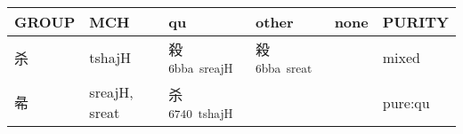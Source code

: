 \documentclass[14pt,a4paper]{scrartcl}
\begin{document}
\begin{longtable}[c]{@{}llllll@{}}
\toprule
\begin{minipage}[b]{0.14\columnwidth}\raggedright\strut
GROUP
\strut\end{minipage} &
\begin{minipage}[b]{0.14\columnwidth}\raggedright\strut
MCH
\strut\end{minipage} &
\begin{minipage}[b]{0.14\columnwidth}\raggedright\strut
qu
\strut\end{minipage} &
\begin{minipage}[b]{0.14\columnwidth}\raggedright\strut
other
\strut\end{minipage} &
\begin{minipage}[b]{0.14\columnwidth}\raggedright\strut
none
\strut\end{minipage} &
\begin{minipage}[b]{0.14\columnwidth}\raggedright\strut
PURITY
\strut\end{minipage}\tabularnewline
\midrule
\endhead
\begin{minipage}[t]{0.14\columnwidth}\raggedright\strut
杀
\strut\end{minipage} &
\begin{minipage}[t]{0.14\columnwidth}\raggedright\strut
tshajH
\strut\end{minipage} &
\begin{minipage}[t]{0.14\columnwidth}\raggedright\strut
殺\textsuperscript{6bba~sreajH}
\strut\end{minipage} &
\begin{minipage}[t]{0.14\columnwidth}\raggedright\strut
殺\textsuperscript{6bba~sreat}
\strut\end{minipage} &
\begin{minipage}[t]{0.14\columnwidth}\raggedright\strut
\strut\end{minipage} &
\begin{minipage}[t]{0.14\columnwidth}\raggedright\strut
mixed
\strut\end{minipage}\tabularnewline
\begin{minipage}[t]{0.14\columnwidth}\raggedright\strut
㣇
\strut\end{minipage} &
\begin{minipage}[t]{0.14\columnwidth}\raggedright\strut
sreajH, sreat
\strut\end{minipage} &
\begin{minipage}[t]{0.14\columnwidth}\raggedright\strut
杀\textsuperscript{6740~tshajH}
\strut\end{minipage} &
\begin{minipage}[t]{0.14\columnwidth}\raggedright\strut
\strut\end{minipage} &
\begin{minipage}[t]{0.14\columnwidth}\raggedright\strut
\strut\end{minipage} &
\begin{minipage}[t]{0.14\columnwidth}\raggedright\strut
pure:qu
\strut\end{minipage}\tabularnewline
\bottomrule
\end{longtable}
\end{document}
